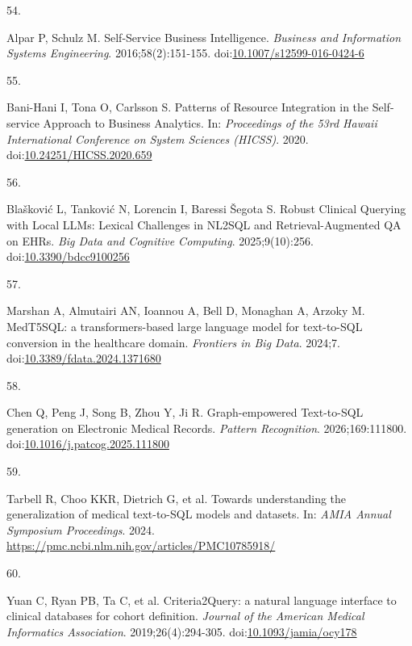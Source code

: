 \documentclass[
  american,
  11pt,
  letterpaper,
  oneside  ,captions=tableheading
]{scrartcl}
\newlength{\cslhangindent}
\newlength{\csllabelwidth}
\newenvironment{CSLReferences}[2] %
 {\begin{list}{}{%
  \setlength{\itemindent}{0pt}
  \setlength{\leftmargin}{0pt}
  \setlength{\parsep}{0pt}
  \ifodd #1
   \setlength{\leftmargin}{\cslhangindent}
   \setlength{\itemindent}{-1\cslhangindent}
  \fi
  \setlength{\itemsep}{#2\baselineskip}}}
 {\end{list}}
\newcommand{\CSLLeftMargin}[1]{\parbox[t]{\csllabelwidth}{\strut#1\strut}}
\newcommand{\CSLRightInline}[1]{\parbox[t]{\linewidth - \csllabelwidth}{\strut#1\strut}}
\begin{document}
\begin{CSLReferences}{0}{1}
\CSLLeftMargin{54. }%
\CSLRightInline{Alpar P, Schulz M. {Self-Service Business Intelligence}.
\emph{Business and Information Systems Engineering}. 2016;58(2):151-155.
doi:\href{https://doi.org/10.1007/s12599-016-0424-6}{10.1007/s12599-016-0424-6}}

\CSLLeftMargin{55. }%
\CSLRightInline{Bani-Hani I, Tona O, Carlsson S. {Patterns of Resource
Integration in the Self-service Approach to Business Analytics}. In:
\emph{Proceedings of the 53rd Hawaii International Conference on System
Sciences (HICSS)}. 2020.
doi:\href{https://doi.org/10.24251/HICSS.2020.659}{10.24251/HICSS.2020.659}}

\CSLLeftMargin{56. }%
\CSLRightInline{Blašković L, Tanković N, Lorencin I, Baressi Šegota S.
{Robust Clinical Querying with Local LLMs: Lexical Challenges in NL2SQL
and Retrieval-Augmented QA on EHRs}. \emph{Big Data and Cognitive
Computing}. 2025;9(10):256.
doi:\href{https://doi.org/10.3390/bdcc9100256}{10.3390/bdcc9100256}}

\CSLLeftMargin{57. }%
\CSLRightInline{Marshan A, Almutairi AN, Ioannou A, Bell D, Monaghan A,
Arzoky M. {MedT5SQL: a transformers-based large language model for
text-to-SQL conversion in the healthcare domain}. \emph{Frontiers in Big
Data}. 2024;7.
doi:\href{https://doi.org/10.3389/fdata.2024.1371680}{10.3389/fdata.2024.1371680}}

\CSLLeftMargin{58. }%
\CSLRightInline{Chen Q, Peng J, Song B, Zhou Y, Ji R. {Graph-empowered
Text-to-SQL generation on Electronic Medical Records}. \emph{Pattern
Recognition}. 2026;169:111800.
doi:\href{https://doi.org/10.1016/j.patcog.2025.111800}{10.1016/j.patcog.2025.111800}}

\CSLLeftMargin{59. }%
\CSLRightInline{{Tarbell R, Choo KKR, Dietrich G, et al.} {Towards
understanding the generalization of medical text-to-SQL models and
datasets}. In: \emph{AMIA Annual Symposium Proceedings}. 2024.
\url{https://pmc.ncbi.nlm.nih.gov/articles/PMC10785918/}}

\CSLLeftMargin{60. }%
\CSLRightInline{Yuan C, Ryan PB, Ta C, et al. {Criteria2Query: a natural
language interface to clinical databases for cohort definition}.
\emph{Journal of the American Medical Informatics Association}.
2019;26(4):294-305.
doi:\href{https://doi.org/10.1093/jamia/ocy178}{10.1093/jamia/ocy178}}


\end{CSLReferences}
\end{document}
